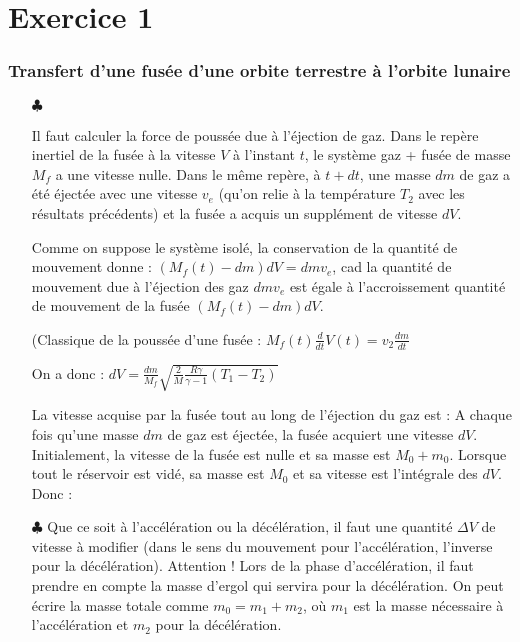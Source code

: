 \documentclass{report}
\begin{document}
\section*{Exercice 1}

\subsubsection*{Transfert d'une fusée d'une orbite terrestre à l'orbite lunaire}

\begin{itemize}

\item[$\clubsuit$] 

Il faut calculer la force de poussée due à l'éjection de gaz. Dans le repère inertiel de la fusée à la vitesse $V$ à l'instant $t$, le système {gaz + fusée} de masse $M_f$ a une vitesse nulle. Dans le même repère, à $t+dt$, une masse $dm$ de gaz a été éjectée avec une vitesse $v_e$ (qu'on relie à la température $T_2$ avec les résultats précédents) et la fusée a acquis un supplément de vitesse $dV$.

Comme on suppose le système isolé, la conservation de la quantité de mouvement donne : $(M_f(t) - dm)dV = dmv_e$, cad la quantité de mouvement due à l'éjection des gaz $dmv_e$ est égale à l'accroissement quantité de mouvement de la fusée $(M_f(t) - dm)dV$.

\noindent{}

(Classique de la poussée d'une fusée : $M_f(t)\frac{d}{dt}V(t)=v_2\frac{dm}{dt}$

On a donc : $dV=\frac{dm}{M_f}\sqrt{\frac{2}{M}\frac{R\gamma}{\gamma-1}(T_1-T_2)}$


La vitesse acquise par la fusée tout au long de l'éjection du gaz est :
A chaque fois qu'une masse $dm$ de gaz est éjectée, la fusée acquiert une vitesse $dV$. Initialement, la vitesse de la fusée est nulle et sa masse est $M_0+m_0$. Lorsque tout le réservoir est vidé, sa masse est $M_0$ et sa vitesse est l'intégrale des $dV$. Donc :

\noindent{}

\item[$\clubsuit$]  Que ce soit à l'accélération ou la décélération, il faut une quantité $\Delta V$ de vitesse à modifier (dans le sens du mouvement pour l'accélération, l'inverse pour la décélération). Attention ! Lors de la phase d'accélération, il faut prendre en compte la masse d'ergol qui servira pour la décélération. On peut écrire la masse totale comme $m_0=m_1+m_2$, où $m_1$ est la masse nécessaire à l'accélération et $m_2$ pour la décélération. 


\end{itemize}
\end{document}
